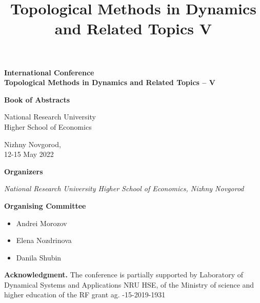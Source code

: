 \documentclass[11pt]{combine}
\title{Topological Methods in Dynamics and Related Topics V}
\begin{document}
	\pagestyle{combine}\thispagestyle{empty}
	
	\begin{titlepage}
		\large
		\begin{center}
			{\bf\Large International Conference \\
				\smallskip
				Topological Methods in Dynamics and Related Topics – V}
		\end{center}
		\vspace*{2cm}
		
		
		\vspace{3.cm}
		
		\centerline{\bf\LARGE Book of Abstracts}
		
		
		\vspace{6cm}
		
		
		\begin{center}{\Large National Research University}\\ {\Large Higher School of Economics}\\
		\end{center}
		
		\vspace{3cm}
		
		\begin{center}{Nizhny Novgorod,\\ 12-15 May 2022}\end{center}
		
	\end{titlepage}
	
	{\Large\bf Organizers}
	
	\vspace{7mm}
	{\it
		National Research University Higher School of Economics, Nizhny Novgorod
	}
	\vspace{10mm}
	
	
	{\bf Organising Committee}
	\begin{itemize}
		\setlength{\itemsep}{1pt}%
		\setlength{\parskip}{1pt}
		\item Andrei Morozov
		\item Elena Nozdrinova
		\item Danila Shubin
	\end{itemize}
	
	
	{\bf Acknowledgment.} The conference is partially supported by Laboratory of Dynamical
	Systems and Applications NRU HSE, of the Ministry of science and higher education of
	the RF grant ag. -15-2019-1931
	
	\clearpage
	\setcounter{page}{3}
	\tableofcontents %
	\clearpage
	
	
	
	\begin{papers}
		
		\let\clearpage\relax
		
		
	\end{papers}
	
\end{document}
